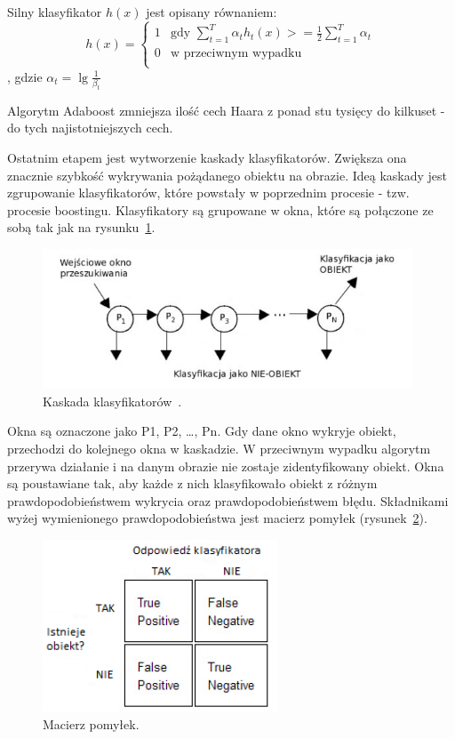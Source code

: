 \documentclass[a4paper,twoside,12pt]{book}
\begin{document}
    Silny klasyfikator $h(x)$ jest opisany równaniem:
    \large
    \begin{equation}
        h(x) = \left\{ \begin{array}{ll}
                           1 & \textrm{gdy $\sum_{t=1}^{T}\alpha_{t}h_{t}(x) >= \frac{1}{2} \sum_{t=1}^{T}\alpha_{t}$}\\
                           0 & \textrm{w przeciwnym wypadku}\\
        \end{array} \right.
        \label{wzor.adaboost4}
    \end{equation}
    \normalsize
    , gdzie $\alpha_{t} = \lg \frac{1}{\beta_{t}}$

    Algorytm Adaboost zmniejsza ilość cech Haara z ponad stu tysięcy do kilkuset - do tych najistotniejszych cech.

    Ostatnim etapem jest wytworzenie kaskady klasyfikatorów.
    Zwiększa ona znacznie szybkość wykrywania pożądanego obiektu na obrazie.
    Ideą kaskady jest zgrupowanie klasyfikatorów,
    które powstały w poprzednim procesie - tzw. procesie boostingu.
    Klasyfikatory są grupowane w okna,
    które są połączone ze sobą tak jak na rysunku~\ref{fig.kaskadaHaar}.
    \begin{figure}
        \centering
        \includegraphics[width=11cm]{Obrazy/kaskadaHaar.jpg}
        \caption{Kaskada klasyfikatorów~\cite{kaskadaHaarObraz}.}
        \label{fig.kaskadaHaar}
    \end{figure}
    Okna są oznaczone jako P1, P2, \ldots, Pn.
    Gdy dane okno wykryje obiekt, przechodzi do kolejnego okna w kaskadzie.
    W przeciwnym wypadku algorytm przerywa działanie i na danym obrazie nie zostaje zidentyfikowany obiekt.
    Okna są poustawiane tak, aby każde z nich klasyfikowało obiekt z różnym prawdopodobieństwem wykrycia oraz
    prawdopodobieństwem błędu.
    Składnikami wyżej wymienionego prawdopodobieństwa jest macierz pomyłek (rysunek~\ref{fig.ConfusionMatrix}).

    \begin{figure}[h!]
        \centering
        \includegraphics[width=7cm]{Obrazy/ConfusionMatrix.jpg}
        \caption{Macierz pomyłek.}
        \label{fig.ConfusionMatrix}
    \end{figure}
\end{document}
